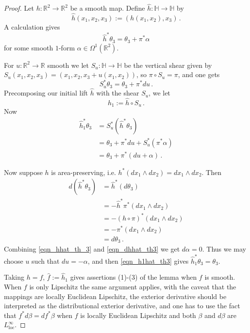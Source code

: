 \documentclass[titlepage]{amsart}
\numberwithin{equation}{section}
\theoremstyle{plain}
\theoremstyle{definition}
\theoremstyle{remark}
\newcommand{\al}{\alpha}
\newcommand{\be}{\beta}
\renewcommand{\H}{\mathbb{H}}
\newcommand{\loc}{\operatorname{loc}}
\newcommand{\Om}{\Omega}
\newcommand{\R}{\mathbb{R}}
\newcommand{\ra}{\rightarrow}
\renewcommand{\th}{\theta}
\newcommand{\we}{\wedge}
\begin{document}
\begin{proof}

Let $h:\R^2\ra\R^2$ be a smooth map.  Define $\hat h:\H\ra\H$ by
\begin{equation}
\label{eqn_hath_definition}
\hat h(x_1,x_2,x_3):=(h(x_1,x_2),x_3)\,.
\end{equation}
  A calculation gives
\begin{equation}
\label{eqn_hhat_th_3}
\hat h^*\th_3=\th_3+\pi^*\al
\end{equation}
for some smooth $1$-form $\al\in \Om^1(\R^2)$.

For $u:\R^2\ra\R$ smooth we let $S_u:\H\ra\H$ be the vertical shear given by $S_u(x_1,x_2,x_3)=(x_1,x_2,x_3+u(x_1,x_2))$, so $\pi\circ S_u=\pi$, and one gets 
\begin{equation}
\label{eqn_su_th3}
S_u^*\th_3=\th_3+\pi^*du\,.
\end{equation}
Precomposing our initial lift $\hat h$ with the shear $S_u$, we let 
\begin{equation}
\label{eqn_hath1_definition}
\hat h_1:=\hat h\circ S_u\,.
\end{equation}  
Now
\begin{equation}
\label{eqn_h1hat_th3}
\begin{aligned}
\hat h_1^*\th_3&=S_u^*(\hat h^*\th_3)\\
&=\th_3+\pi^*du+S_u^*(\pi^*\al)\\
&=\th_3+\pi^*(du+\al)\,.
\end{aligned}
\end{equation}

Now suppose $h$ is area-preserving, i.e. $h^*(dx_1\we dx_2)=dx_1\we dx_2$.  Then 
\begin{equation}
\label{eqn_dhhat_th3}
\begin{aligned}
d(\hat h^*\th_3)&=\hat h^*(d\th_3)\\
&=-\hat h^*\pi^*(dx_1\we dx_2)\\
&=-(h\circ\pi)^*(dx_1\we dx_2)\\
&=-\pi^*(dx_1\we dx_2)\\
&=d\th_3\,.
\end{aligned}
\end{equation}
Combining \eqref{eqn_hhat_th_3} and \eqref{eqn_dhhat_th3} we get $d\al=0$.  Thus we may choose $u$ such that $du=-\al$, and then \eqref{eqn_h1hat_th3} gives $\hat h_1^*\th_3=\th_3$.  

Taking $h=f$, $\hat f:=\hat{h}_1$ gives assertions (1)-(3) of the lemma when $f$ is smooth.  When $f$ is only Lipschitz the same argument applies, with the caveat that the mappings are locally Euclidean Lipschitz,  the exterior derivative should be interpreted as the distributional exterior derivative, and one has to use the fact that $f^*d\be=df^*\be$ when $f$ is locally Euclidean Lipschitz and both $\be$ and $d\be$ are $L^\infty_{\loc}$.


\end{proof}
\end{document}
